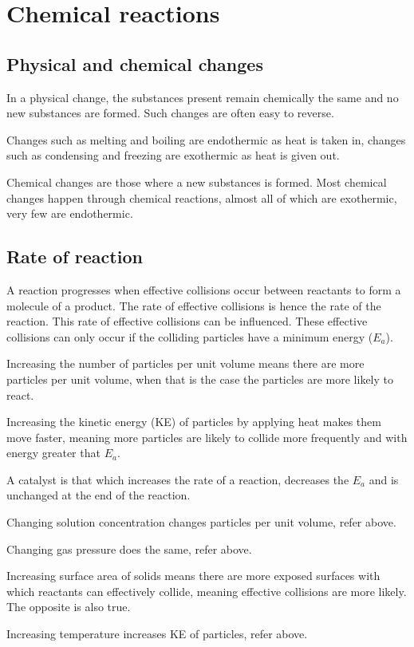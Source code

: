 \section{Chemical reactions}
\subsection{Physical and chemical changes}
In a physical change, the substances present remain chemically the same and no new substances
are formed. Such changes are often easy to reverse.

Changes such as melting and boiling are endothermic as heat is taken in, changes such as 
condensing and freezing are exothermic as heat is given out.

Chemical changes are those where a new substances is formed. Most chemical changes happen through
chemical reactions, almost all of which are exothermic, very few are endothermic.

\subsection{Rate of reaction}
A reaction progresses when effective collisions occur between reactants to form a molecule of a
product. The rate of effective collisions is hence the rate of the reaction. This rate of effective
collisions can be influenced. These effective collisions can only occur if the colliding particles
have a minimum energy ($E_a$).

Increasing the number of particles per unit volume means there are more particles per unit volume,
when that is the case the particles are more likely to react.

Increasing the kinetic energy (KE) of particles by applying heat makes them move faster, meaning
more particles are likely to collide more frequently and with energy greater that $E_a$.

A catalyst is that which increases the rate of a reaction, decreases the $E_a$ and is unchanged
at the end of the reaction.

Changing solution concentration changes particles per unit volume, refer above.

Changing gas pressure does the same, refer above.

Increasing surface area of solids means there are more exposed surfaces with which reactants can
effectively collide, meaning effective collisions are more likely. The opposite is also true.

Increasing temperature increases KE of particles, refer above.


